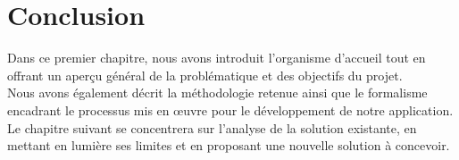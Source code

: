 {{\section*{Conclusion}

\normalsize{

Dans ce premier chapitre, nous avons introduit l’organisme d’accueil tout en offrant un aperçu général de la problématique et des objectifs du projet. \\
Nous avons également décrit la méthodologie retenue ainsi que le formalisme encadrant le processus mis en œuvre pour le développement de notre application. \\
Le chapitre suivant se concentrera sur l’analyse de la solution existante, en mettant en lumière ses limites et en proposant une nouvelle solution à concevoir.

}

}
}
